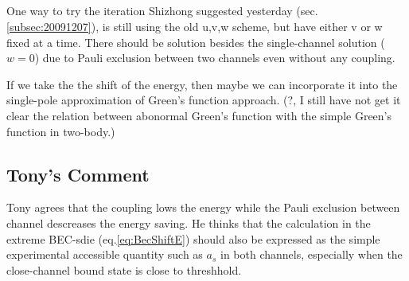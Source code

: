 \subsection{}
One way to try the iteration Shizhong suggested yesterday (sec. \ref{subsec:20091207}), is still using the old u,v,w scheme, but have either v or w fixed at a time. There should be solution besides the single-channel solution ($w=0$)  due to Pauli exclusion between two channels even without any coupling. 

If we take the the shift of the energy, then maybe we can incorporate it into the single-pole approximation of Green's function approach. (?, I still have not get it clear the relation between abonormal Green's function with the simple Green's function in two-body.) 
\subsection{Tony's Comment}
Tony agrees that the coupling lows the energy while the Pauli exclusion between channel descreases the energy saving.  He thinks that the calculation in the extreme BEC-sdie (eq.\eqref{eq:BecShiftE}) should also be expressed as the simple experimental accessible quantity such as $a_s$ in both channels, especially when the close-channel bound state is close to threshhold.  